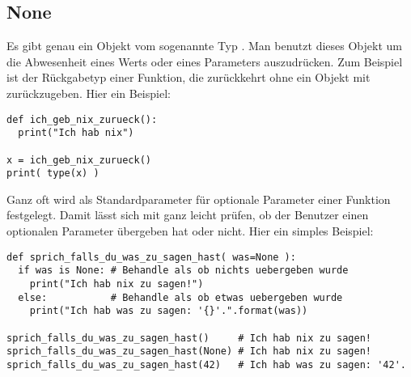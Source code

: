 \subsection{None}
\label{section:std_data_types:none}
Es gibt genau ein Objekt  vom sogenannte Typ .
Man benutzt dieses Objekt um die Abwesenheit eines Werts oder eines Parameters auszudrücken.
Zum Beispiel ist  der Rückgabetyp einer Funktion, die zurückkehrt ohne ein Objekt mit  zurückzugeben.
Hier ein Beispiel:
\begin{lstlisting}
def ich_geb_nix_zurueck():
  print("Ich hab nix")

x = ich_geb_nix_zurueck()
print( type(x) )
\end{lstlisting}

Ganz oft wird  als Standardparameter für optionale Parameter einer Funktion festgelegt.
Damit lässt sich mit ganz leicht prüfen, ob der Benutzer einen optionalen Parameter übergeben hat oder nicht.
Hier ein simples Beispiel:
\begin{lstlisting}
def sprich_falls_du_was_zu_sagen_hast( was=None ):
  if was is None: # Behandle als ob nichts uebergeben wurde
    print("Ich hab nix zu sagen!")
  else:           # Behandle als ob etwas uebergeben wurde
    print("Ich hab was zu sagen: '{}'.".format(was))

sprich_falls_du_was_zu_sagen_hast()     # Ich hab nix zu sagen!
sprich_falls_du_was_zu_sagen_hast(None) # Ich hab nix zu sagen!
sprich_falls_du_was_zu_sagen_hast(42)   # Ich hab was zu sagen: '42'.
\end{lstlisting}

